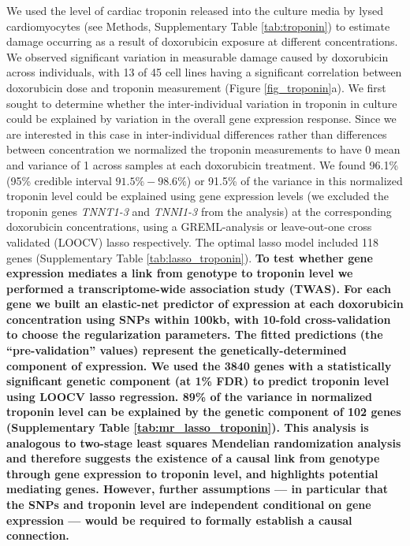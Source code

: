 \documentclass{article}
\newcommand{\tempbold}[1]{\textbf{#1}}
\begin{document}
We used the level of cardiac troponin released into the culture media by lysed cardiomyocytes (see Methods, Supplementary Table \ref{tab:troponin}) to estimate damage occurring as a result of doxorubicin exposure at different concentrations. We observed significant variation in measurable damage caused by doxorubicin across individuals, with 13 of 45 cell lines having a significant correlation between doxorubicin dose and troponin measurement (Figure \ref{fig_troponin}a). We first sought to determine whether the inter-individual variation in troponin in culture could be explained by variation in the overall gene expression response. Since we are interested in this case in inter-individual differences rather than differences between concentration we normalized the troponin measurements to have 0 mean and variance of 1 across samples at each doxorubicin treatment. We found 96.1\% (95\% credible interval $91.5\%  - 98.6\%$) or 91.5\% of the variance in this normalized troponin level could be explained using gene expression levels (we excluded the troponin genes \emph{TNNT1-3} and \emph{TNNI1-3} from the analysis) at the corresponding doxorubicin concentrations, using a GREML-analysis\cite{Yang2010-cx} or leave-out-one cross validated (LOOCV) lasso\cite{tibshirani1996regression} respectively. The optimal lasso model included 118 genes (Supplementary Table \ref{tab:lasso_troponin}). \tempbold{To test whether gene expression mediates a link from genotype to troponin level we performed a transcriptome-wide association study\cite{Gamazon2015-ij} (TWAS). For each gene we built an elastic-net predictor of expression at each doxorubicin concentration using SNPs within 100kb, with 10-fold cross-validation to choose the regularization parameters. The fitted predictions (the ``pre-validation'' values) represent the genetically-determined component of expression. We used the 3840 genes with a statistically significant genetic component (at 1\% FDR) to predict troponin level using LOOCV lasso regression. 89\% of the variance in normalized troponin level can be explained by the genetic component of 102 genes (Supplementary Table \ref{tab:mr_lasso_troponin}). This analysis is analogous to two-stage least squares Mendelian randomization\cite{Angrist1995-kp} analysis and therefore suggests the existence of a causal link from genotype through gene expression to troponin level, and highlights potential mediating genes. However, further assumptions --- in particular that the SNPs and troponin level are independent conditional on gene expression --- would be required to formally establish a causal connection.}
\end{document}
